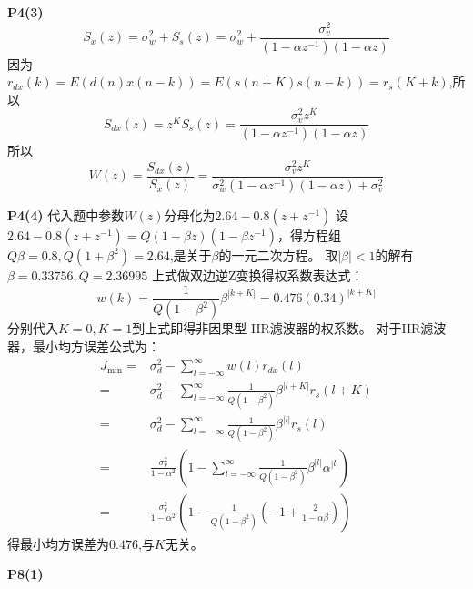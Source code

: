 \documentclass{article}
\begin{document}
\textbf{P4(3)}
\begin{equation}
S_x(z)=\sigma_w^2+S_s(z)=\sigma_w^2+\frac{\sigma_v^2}{(1-\alpha z^{-1})(1-\alpha z)}
\end{equation}
因为$r_{dx}(k)=E(d(n)x(n-k))=E(s(n+K)s(n-k))=r_s(K+k)$,所以
\begin{equation}
S_{dx}(z)=z^K S_s(z) =\frac{\sigma_v^2 z^K}{(1-\alpha z^{-1})(1-\alpha z)}
\end{equation}
所以
\begin{equation}
W(z)=\frac{S_{dx}(z)}{S_x(z)}=\frac{\sigma_v^2 z^K}{\sigma_w^2(1-\alpha z^{-1})(1-\alpha z)+\sigma_v^2}
\end{equation}

\textbf{P4(4)}
代入题中参数$W(z)$分母化为$2.64-0.8(z+z^{-1})$
设$2.64-0.8(z+z^{-1})=Q(1-\beta z)(1-\beta z^{-1})$，得方程组$Q\beta=0.8,Q(1+\beta^2)=2.64$,是关于$\beta$的一元二次方程。
取$|\beta|<1$的解有$\beta=0.33756,Q=2.36995$
上式做双边逆Z变换得权系数表达式：
\begin{equation}
w(k)=\frac{1}{Q(1-\beta^2)}\beta^{|k+K|}=0.476(0.34)^{|k+K|}
\end{equation}
分别代入$K=0,K=1$到上式即得非因果型 IIR滤波器的权系数。
对于IIR滤波器，最小均方误差公式为：
\begin{align} 
J_{\text{min}}=& \sigma_d^2-\sum_{l=-\infty}^{\infty} w(l) r_{dx}(l)\\
 =&\sigma_d^2-\sum_{l=-\infty}^{\infty} \frac{1}{Q(1-\beta^2)}\beta^{|l+K|} r_{s}(l+K)\\
 =&\sigma_d^2-\sum_{l=-\infty}^{\infty} \frac{1}{Q(1-\beta^2)}\beta^{|l|} r_{s}(l)\\
 =&\frac{\sigma_v^2}{1-\alpha^2}\left(1-\sum_{l=-\infty}^{\infty} \frac{1}{Q(1-\beta^2)}\beta^{|l|} \alpha^{|l|}\right)\\
 =&\frac{\sigma_v^2}{1-\alpha^2}\left(1-\frac{1}{Q(1-\beta^2)}(-1+\frac{2}{1-\alpha\beta})\right)
 \end{align}
 得最小均方误差为$0.476$,与$K$无关。
 
 \textbf{P8(1)}
 
\end{document}
